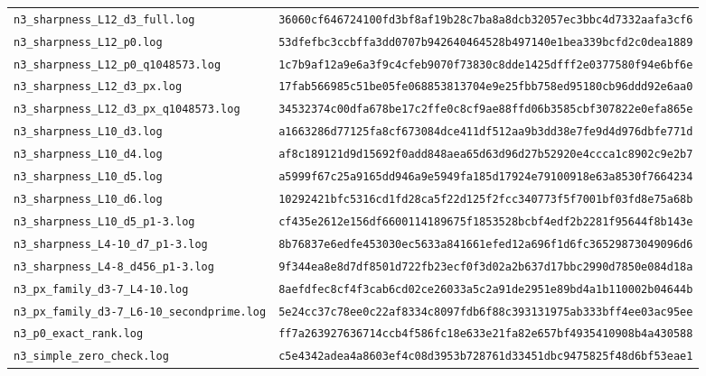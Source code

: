 \documentclass[aps,prx,reprint,superscriptaddress,nobibnotes,longbibliography]{revtex4-2}
\begin{document}
\begin{table}[t]
\begin{ruledtabular}
\begin{tabular}{ll}
\texttt{n3\_sharpness\_L12\_d3\_full.log} & \texttt{\scriptsize 36060cf646724100fd3bf8af19b28c7ba8a8dcb32057ec3bbc4d7332aafa3cf6}\\
\texttt{n3\_sharpness\_L12\_p0.log} & \texttt{\scriptsize 53dfefbc3ccbffa3dd0707b942640464528b497140e1bea339bcfd2c0dea1889}\\
\texttt{n3\_sharpness\_L12\_p0\_q1048573.log} & \texttt{\scriptsize 1c7b9af12a9e6a3f9c4cfeb9070f73830c8dde1425dfff2e0377580f94e6bf6e}\\
\texttt{n3\_sharpness\_L12\_d3\_px.log} & \texttt{\scriptsize 17fab566985c51be05fe068853813704e9e25fbb758ed95180cb96ddd92e6aa0}\\
\texttt{n3\_sharpness\_L12\_d3\_px\_q1048573.log} & \texttt{\scriptsize 34532374c00dfa678be17c2ffe0c8cf9ae88ffd06b3585cbf307822e0efa865e}\\
\texttt{n3\_sharpness\_L10\_d3.log} & \texttt{\scriptsize a1663286d77125fa8cf673084dce411df512aa9b3dd38e7fe9d4d976dbfe771d}\\
\texttt{n3\_sharpness\_L10\_d4.log} & \texttt{\scriptsize af8c189121d9d15692f0add848aea65d63d96d27b52920e4ccca1c8902c9e2b7}\\
\texttt{n3\_sharpness\_L10\_d5.log} & \texttt{\scriptsize a5999f67c25a9165dd946a9e5949fa185d17924e79100918e63a8530f7664234}\\
\texttt{n3\_sharpness\_L10\_d6.log} & \texttt{\scriptsize 10292421bfc5316cd1fd28ca5f22d125f2fcc340773f5f7001bf03fd8e75a68b}\\
\texttt{n3\_sharpness\_L10\_d5\_p1-3.log} & \texttt{\scriptsize cf435e2612e156df6600114189675f1853528bcbf4edf2b2281f95644f8b143e}\\
\texttt{n3\_sharpness\_L4-10\_d7\_p1-3.log} & \texttt{\scriptsize 8b76837e6edfe453030ec5633a841661efed12a696f1d6fc36529873049096d6}\\
\texttt{n3\_sharpness\_L4-8\_d456\_p1-3.log} & \texttt{\scriptsize 9f344ea8e8d7df8501d722fb23ecf0f3d02a2b637d17bbc2990d7850e084d18a}\\
\texttt{n3\_px\_family\_d3-7\_L4-10.log} & \texttt{\scriptsize 8aefdfec8cf4f3cab6cd02ce26033a5c2a91de2951e89bd4a1b110002b04644b}\\
\texttt{n3\_px\_family\_d3-7\_L6-10\_secondprime.log} & \texttt{\scriptsize 5e24cc37c78ee0c22af8334c8097fdb6f88c393131975ab333bff4ee03ac95ee}\\
\texttt{n3\_p0\_exact\_rank.log} & \texttt{\scriptsize ff7a263927636714ccb4f586fc18e633e21fa82e657bf4935410908b4a430588}\\
\texttt{n3\_simple\_zero\_check.log} & \texttt{\scriptsize c5e4342adea4a8603ef4c08d3953b728761d33451dbc9475825f48d6bf53eae1}\\

\end{tabular}
\end{ruledtabular}
\end{table}
\end{document}
